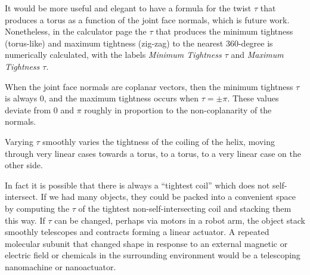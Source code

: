 \documentclass{svproc}
\begin{document}


It would be more useful and elegant to have a formula for the twist $\tau$ that produces
a torus as a function of the joint face normals, which is future work.
Nonetheless, in the calculator page
the $\tau$ that produces the minimum tightness (torus-like) and maximum tightness (zig-zag) to the
nearest 360-degree is numerically calculated,
with the labels {\em Minimum Tightness $\tau$} and {\em Maximum Tightness $\tau$}.

When the joint face normals are coplanar vectors, then the minimum tightness $\tau$ is
always $0$, and the maximum tightness occurs when $\tau = \pm \pi$.
These values deviate from $0$ and $\pi$ roughly in proportion
to the non-coplanarity of the normals.

Varying $\tau$ smoothly varies the tightness of the coiling of the helix,
moving through very linear cases towards a torus,
to a torus, to a very linear case on the other side.

In fact it is possible that there is always a ``tightest coil''
which does not self-intersect. If we had many objects,
they could be packed into a convenient space by computing the $\tau$
of the tightest non-self-intersecting coil and stacking them this way.
If $\tau$ can be changed, perhaps via motors in a robot arm,
the object stack smoothly telescopes and contracts forming a
linear actuator.
A repeated molecular subunit that changed shape in
response to an external magnetic or electric field or chemicals in the surrounding
environment would be a telescoping nanomachine or nanoactuator.




\end{document}
